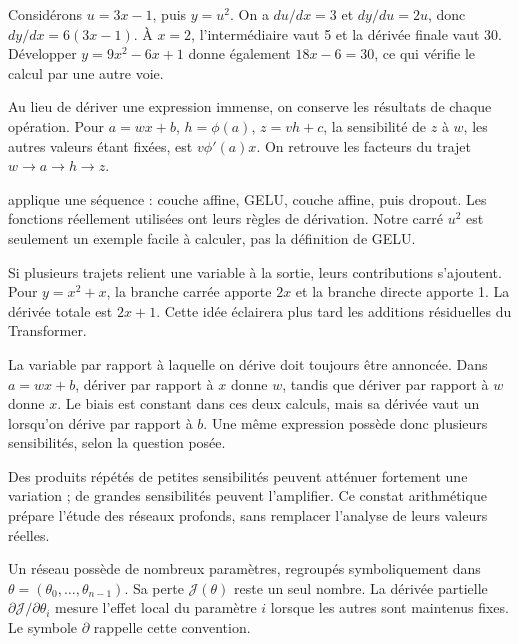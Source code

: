 Considérons \(u=3x-1\), puis \(y=u^2\).
On a \(du/dx=3\) et \(dy/du=2u\), donc
\(dy/dx=6(3x-1)\). À \(x=2\), l'intermédiaire
vaut 5 et la dérivée finale vaut 30.
Développer \(y=9x^2-6x+1\) donne également
\(18x-6=30\), ce qui vérifie le calcul par une autre voie.

Au lieu de dériver une expression immense, on conserve les
résultats de chaque opération. Pour
\(a=wx+b\), \(h=\phi(a)\), \(z=vh+c\), la sensibilité
de \(z\) à \(w\), les autres valeurs étant fixées, est
\(v\phi'(a)x\). On retrouve les facteurs du trajet
\(w\rightarrow a\rightarrow h\rightarrow z\).

 applique une séquence :
couche affine, GELU, couche affine, puis dropout.
Les fonctions réellement utilisées ont leurs règles de dérivation.
Notre carré \(u^2\) est seulement un exemple facile à calculer,
pas la définition de GELU.

Si plusieurs trajets relient une variable à la sortie,
leurs contributions s'ajoutent. Pour \(y=x^2+x\),
la branche carrée apporte \(2x\) et la branche directe
apporte 1. La dérivée totale est \(2x+1\).
Cette idée éclairera plus tard les additions résiduelles
du Transformer.

La variable par rapport à laquelle on dérive doit toujours
être annoncée. Dans \(a=wx+b\), dériver par rapport à
\(x\) donne \(w\), tandis que dériver par rapport à
\(w\) donne \(x\). Le biais est constant dans ces deux
calculs, mais sa dérivée vaut un lorsqu'on dérive par rapport
à \(b\). Une même expression possède donc plusieurs sensibilités,
selon la question posée.

Des produits répétés de petites sensibilités peuvent atténuer
fortement une variation ; de grandes sensibilités peuvent
l'amplifier. Ce constat arithmétique prépare l'étude des
réseaux profonds, sans remplacer l'analyse de leurs valeurs réelles.



Un réseau possède de nombreux paramètres, regroupés symboliquement
dans \(\theta=(\theta_0,\ldots,\theta_{n-1})\).
Sa perte \(\mathcal{J}(\theta)\) reste un seul nombre.
La dérivée partielle
\(\partial\mathcal{J}/\partial\theta_i\) mesure l'effet local
du paramètre \(i\) lorsque les autres sont maintenus fixes.
Le symbole \(\partial\) rappelle cette convention.

